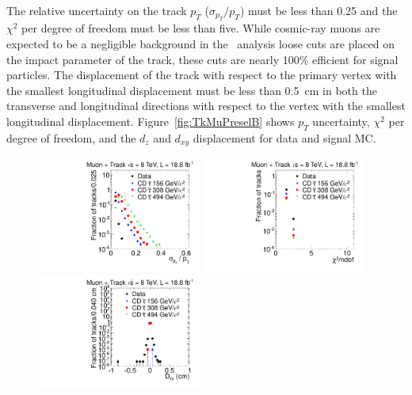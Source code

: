 The relative uncertainty on the track $p_T$ ($\sigma_{p_T}/p_T$) must be less than 0.25 and the $\chi^2$ per degree of freedom must be less than five.
While cosmic-ray muons are expected to be a negligible background in the \tktof\ analysis loose cuts are placed on the impact parameter of the track, 
these cuts are nearly 100\% efficient for signal particles.
The displacement of the track with respect to the primary vertex
with the smallest longitudinal displacement must be less than 0.5~cm in both the transverse and longitudinal directions with respect to the vertex with the smallest
longitudinal displacement.
Figure~\ref{fig:TkMuPreselB} shows $p_T$ uncertainty, $\chi^2$ per degree of freedom, and the $d_z$ and $d_{xy}$ displacement for data and signal MC.

\begin{figure}
\centering
  \includegraphics[clip=false, trim=0.0cm 0cm 0.0cm 0cm, width=0.48\textwidth]{figures/tkmu/Selection_Comp_8TeV_GMStau_Pterr_BS}
  \includegraphics[clip=false, trim=0.0cm 0cm 0.0cm 0cm, width=0.48\textwidth]{figures/tkmu/Selection_Comp_8TeV_GMStau_Chi2_BS} \\
  \includegraphics[clip=false, trim=0.0cm 0cm 0.0cm 0cm, width=0.48\textwidth]{figures/tkmu/Selection_Comp_8TeV_GMStau_Dxy_BS}

\end{figure}
